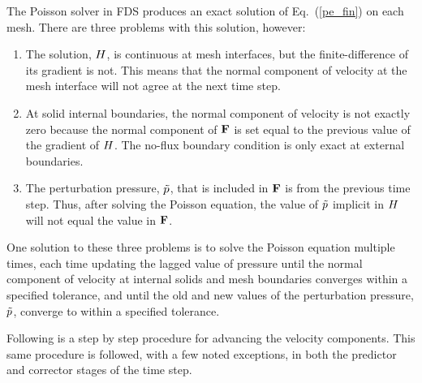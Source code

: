 The Poisson solver in FDS produces an exact solution of Eq.~(\ref{pe_fin}) on each mesh. There are three problems with this solution, however:
\begin{enumerate}
\item The solution, $H$, is continuous at mesh interfaces, but the finite-difference of its gradient is not. This means that the normal component of velocity at the mesh interface will not agree at the next time step.
\item At solid internal boundaries, the normal component of velocity is not exactly zero because the normal component of ${\mathbf{F}}$ is set equal to the previous value of the gradient of $H$. The no-flux boundary condition is only exact at external boundaries.
\item The perturbation pressure, $\tilde{p}$, that is included in ${\mathbf{F}}$ is from the previous time step. Thus, after solving the Poisson equation, the value of $\tilde{p}$ implicit in $H$ will not equal the value in ${\mathbf{F}}$.
\end{enumerate}
One solution to these three problems is to solve the Poisson equation multiple times, each time updating the lagged value of pressure until the normal component of velocity at internal solids and mesh boundaries converges within a specified tolerance, and until the old and new values of the perturbation pressure, $\tilde{p}$, converge to within a specified tolerance.

Following is a step by step procedure for advancing the velocity components. This same procedure is followed, with a few noted exceptions, in both the predictor and corrector stages of the time step.

